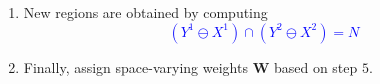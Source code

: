 \documentclass{article}
\begin{document}
\begin{boxedminipage}{\textwidth}
{\begin{enumerate}
{\begin{equation*}
           \end{equation*}}
\vspace{-0.4cm}
   \item  New regions are obtained by computing
\vspace{-0.2cm}
          \textcolor{blue}{\begin{equation*}
          (Y^1 \ominus X^1)\cap(Y^2 \ominus X^2)= N
          \end{equation*}}   
\vspace{-0.5cm}
    \item Finally, assign space-varying weights $\boldsymbol{W}$ based on step $5$.
    \end{enumerate}
\label{algo:newRegionDetection}
}
\end{boxedminipage}
\newpage


\end{document}
